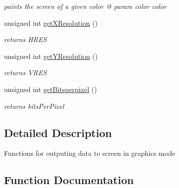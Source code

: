 \begin{DoxyCompactItemize}
\begin{DoxyCompactList}\small\item\em paints the screen of a given color @ param color color \end{DoxyCompactList}\item 
unsigned int \hyperlink{group__video__gr_ga1a8aabbecf50f97e0e89085418bf89c6}{get\+X\+Resolution} ()\hypertarget{group__video__gr_ga1a8aabbecf50f97e0e89085418bf89c6}{}\label{group__video__gr_ga1a8aabbecf50f97e0e89085418bf89c6}

\begin{DoxyCompactList}\small\item\em returns H\+R\+ES \end{DoxyCompactList}\item 
unsigned int \hyperlink{group__video__gr_gaa646359413ff436a71129fa3fadd38d8}{get\+Y\+Resolution} ()\hypertarget{group__video__gr_gaa646359413ff436a71129fa3fadd38d8}{}\label{group__video__gr_gaa646359413ff436a71129fa3fadd38d8}

\begin{DoxyCompactList}\small\item\em returns V\+R\+ES \end{DoxyCompactList}\item 
unsigned int \hyperlink{group__video__gr_gac09e6ad099b04be453eee94850b838a8}{get\+Bitsperpixel} ()\hypertarget{group__video__gr_gac09e6ad099b04be453eee94850b838a8}{}\label{group__video__gr_gac09e6ad099b04be453eee94850b838a8}

\begin{DoxyCompactList}\small\item\em returns bits\+Per\+Pixel \end{DoxyCompactList}\end{DoxyCompactItemize}


\subsection{Detailed Description}
Functions for outputing data to screen in graphics mode 

\subsection{Function Documentation}
